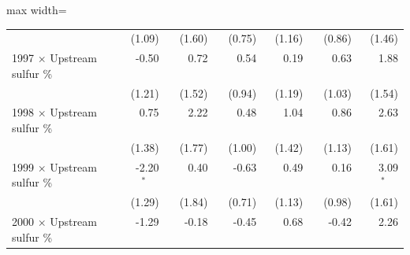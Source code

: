 \begin{table}[htbp]
{\begin{adjustbox}{max width=\linewidth}
\begin{tabular}{lrrrrrr}
 & (\phantom{-}1.09)\phantom{$^{***}$} & (\phantom{-}1.60)\phantom{$^{***}$} & (\phantom{-}0.75)\phantom{$^{***}$} & (\phantom{-}1.16)\phantom{$^{***}$} & (\phantom{-}0.86)\phantom{$^{***}$} & (\phantom{-}1.46)\phantom{$^{***}$} \\
1997 $\times$ Upstream sulfur \% & \phantom{(}-0.50$^{\phantom{*}\phantom{*}\phantom{*}}$ & \phantom{(}\phantom{-}0.72$^{\phantom{*}\phantom{*}\phantom{*}}$ & \phantom{(}\phantom{-}0.54$^{\phantom{*}\phantom{*}\phantom{*}}$ & \phantom{(}\phantom{-}0.19$^{\phantom{*}\phantom{*}\phantom{*}}$ & \phantom{(}\phantom{-}0.63$^{\phantom{*}\phantom{*}\phantom{*}}$ & \phantom{(}\phantom{-}1.88$^{\phantom{*}\phantom{*}\phantom{*}}$ \\
 & (\phantom{-}1.21)\phantom{$^{***}$} & (\phantom{-}1.52)\phantom{$^{***}$} & (\phantom{-}0.94)\phantom{$^{***}$} & (\phantom{-}1.19)\phantom{$^{***}$} & (\phantom{-}1.03)\phantom{$^{***}$} & (\phantom{-}1.54)\phantom{$^{***}$} \\
1998 $\times$ Upstream sulfur \% & \phantom{(}\phantom{-}0.75$^{\phantom{*}\phantom{*}\phantom{*}}$ & \phantom{(}\phantom{-}2.22$^{\phantom{*}\phantom{*}\phantom{*}}$ & \phantom{(}\phantom{-}0.48$^{\phantom{*}\phantom{*}\phantom{*}}$ & \phantom{(}\phantom{-}1.04$^{\phantom{*}\phantom{*}\phantom{*}}$ & \phantom{(}\phantom{-}0.86$^{\phantom{*}\phantom{*}\phantom{*}}$ & \phantom{(}\phantom{-}2.63$^{\phantom{*}\phantom{*}\phantom{*}}$ \\
 & (\phantom{-}1.38)\phantom{$^{***}$} & (\phantom{-}1.77)\phantom{$^{***}$} & (\phantom{-}1.00)\phantom{$^{***}$} & (\phantom{-}1.42)\phantom{$^{***}$} & (\phantom{-}1.13)\phantom{$^{***}$} & (\phantom{-}1.61)\phantom{$^{***}$} \\
1999 $\times$ Upstream sulfur \% & \phantom{(}-2.20$^{*\phantom{*}\phantom{*}}$ & \phantom{(}\phantom{-}0.40$^{\phantom{*}\phantom{*}\phantom{*}}$ & \phantom{(}-0.63$^{\phantom{*}\phantom{*}\phantom{*}}$ & \phantom{(}\phantom{-}0.49$^{\phantom{*}\phantom{*}\phantom{*}}$ & \phantom{(}\phantom{-}0.16$^{\phantom{*}\phantom{*}\phantom{*}}$ & \phantom{(}\phantom{-}3.09$^{*\phantom{*}\phantom{*}}$ \\
 & (\phantom{-}1.29)\phantom{$^{***}$} & (\phantom{-}1.84)\phantom{$^{***}$} & (\phantom{-}0.71)\phantom{$^{***}$} & (\phantom{-}1.13)\phantom{$^{***}$} & (\phantom{-}0.98)\phantom{$^{***}$} & (\phantom{-}1.61)\phantom{$^{***}$} \\
2000 $\times$ Upstream sulfur \% & \phantom{(}-1.29$^{\phantom{*}\phantom{*}\phantom{*}}$ & \phantom{(}-0.18$^{\phantom{*}\phantom{*}\phantom{*}}$ & \phantom{(}-0.45$^{\phantom{*}\phantom{*}\phantom{*}}$ & \phantom{(}\phantom{-}0.68$^{\phantom{*}\phantom{*}\phantom{*}}$ & \phantom{(}-0.42$^{\phantom{*}\phantom{*}\phantom{*}}$ & \phantom{(}\phantom{-}2.26$^{\phantom{*}\phantom{*}\phantom{*}}$ \\

\end{tabular}
\end{adjustbox}}
\end{table}
